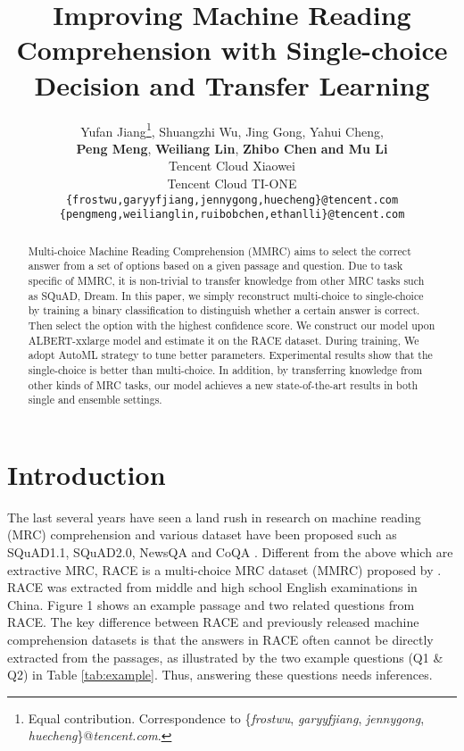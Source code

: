 \documentclass[11pt,a4paper]{article}
\title{Improving Machine Reading Comprehension with Single-choice Decision and Transfer Learning}
\author{
  Yufan Jiang\thanks{Equal contribution. Correspondence to
  \{{\em frostwu}, {\em garyyfjiang}, {\em jennygong}, {\em huecheng}\}@{\em tencent.com}.},
  Shuangzhi Wu,
  Jing Gong,
  Yahui Cheng, \\
  \textbf{Peng Meng},
  \textbf{Weiliang Lin},
  \textbf{Zhibo Chen}
  \textbf{and Mu Li}\\
  Tencent Cloud Xiaowei\\ 
  Tencent Cloud TI-ONE \\
  {\tt
        \{frostwu,garyyfjiang,jennygong,huecheng\}@tencent.com 
  }\\
  {\tt
        \{pengmeng,weilianglin,ruibobchen,ethanlli\}@tencent.com 
  }\\
}
\date{}
\begin{document}
\maketitle

\begin{abstract}
Multi-choice Machine Reading Comprehension (MMRC) aims to select the correct answer from a set of options based on a given
passage and question. Due to task specific
of MMRC, it is non-trivial to transfer knowledge from other MRC tasks such as SQuAD,
Dream. In this paper, we simply reconstruct
multi-choice to single-choice by training a binary classification to distinguish whether a
certain answer is correct. Then select the option with the highest confidence score. We
construct our model upon ALBERT-xxlarge
model and estimate it on the RACE dataset.
During training, We adopt AutoML strategy
to tune better parameters. Experimental results show that the single-choice is better than
multi-choice. In addition, by transferring
knowledge from other kinds of MRC tasks,
our model achieves a new state-of-the-art results in both single and ensemble settings.

\end{abstract}

\section{Introduction}

The last several years have seen a land rush in research on machine reading (MRC) comprehension and various dataset have been proposed such as SQuAD1.1, SQuAD2.0, NewsQA and CoQA \cite{rajpurkar2016squad,trischler2016newsqa,reddy2019coqa}. Different from the above which are extractive MRC, RACE is a multi-choice MRC dataset (MMRC) proposed by \cite{lai2017race}. RACE was extracted from middle and high school English examinations in China. Figure 1 shows an example passage and two related questions from RACE. The key difference between RACE and previously released machine comprehension datasets is that the answers in RACE often cannot be directly extracted from the passages, as illustrated by the two example questions (Q1 \& Q2) in Table \ref{tab:example}. Thus, answering these questions needs inferences.
\end{document}
